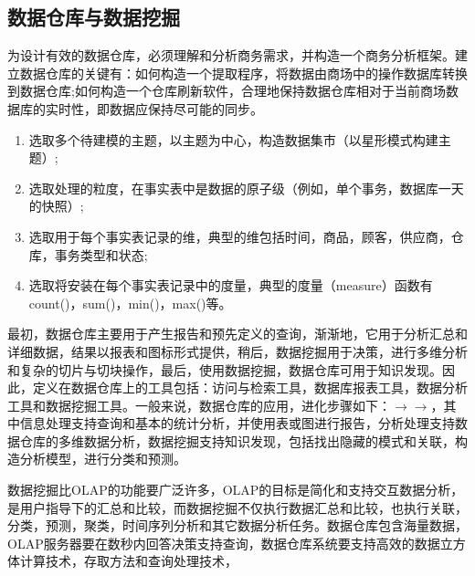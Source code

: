 \subsection{数据仓库与数据挖掘}
\par 为设计有效的数据仓库，必须理解和分析商务需求，并构造一个商务分析框架。建立数据仓库的关键有：如何构造一个提取程序，将数据由商场中的操作数据库转换到数据仓库;如何构造一个仓库刷新软件，合理地保持数据仓库相对于当前商场数据库的实时性，即数据应保持尽可能的同步。
\begin{enumerate}[(1)]
\item 选取多个待建模的主题，以主题为中心，构造数据集市（以星形模式构建主题）;
\item 选取处理的粒度，在事实表中是数据的原子级（例如，单个事务，数据库一天的快照）;
\item 选取用于每个事实表记录的维，典型的维包括时间，商品，顾客，供应商，仓库，事务类型和状态;
\item 选取将安装在每个事实表记录中的度量，典型的度量（measure）函数有count()，sum()，min()，max()等。
\end{enumerate}
\par 最初，数据仓库主要用于产生报告和预先定义的查询，渐渐地，它用于分析汇总和详细数据，结果以报表和图标形式提供，稍后，数据挖掘用于决策，进行多维分析和复杂的切片与切块操作，最后，使用数据挖掘，数据仓库可用于知识发现。因此，定义在数据仓库上的工具包括：访问与检索工具，数据库报表工具，数据分析工具和数据挖掘工具。一般来说，数据仓库的应用，进化步骤如下：$\longrightarrow$$\longrightarrow$，其中信息处理支持查询和基本的统计分析，并使用表或图进行报告，分析处理支持数据仓库的多维数据分析，数据挖掘支持知识发现，包括找出隐藏的模式和关联，构造分析模型，进行分类和预测。
\par 数据挖掘比OLAP的功能要广泛许多，OLAP的目标是简化和支持交互数据分析，是用户指导下的汇总和比较，而数据挖掘不仅执行数据汇总和比较，也执行关联，分类，预测，聚类，时间序列分析和其它数据分析任务。数据仓库包含海量数据，OLAP服务器要在数秒内回答决策支持查询，数据仓库系统要支持高效的数据立方体计算技术，存取方法和查询处理技术，

